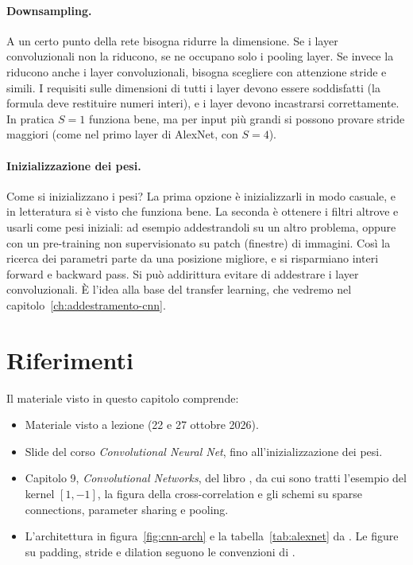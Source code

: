 \paragraph{Downsampling.}
A un certo punto della rete bisogna ridurre la dimensione. Se i layer convoluzionali non la riducono, se ne occupano solo i pooling layer. Se invece la riducono anche i layer convoluzionali, bisogna scegliere con attenzione stride e simili. I requisiti sulle dimensioni di tutti i layer devono essere soddisfatti (la formula deve restituire numeri interi), e i layer devono incastrarsi correttamente. In pratica $S = 1$ funziona bene, ma per input più grandi si possono provare stride maggiori (come nel primo layer di AlexNet, con $S = 4$).

\paragraph{Inizializzazione dei pesi.}
Come si inizializzano i pesi? La prima opzione è inizializzarli in modo casuale, e in letteratura si è visto che funziona bene. La seconda è ottenere i filtri altrove e usarli come pesi iniziali: ad esempio addestrandoli su un altro problema, oppure con un pre-training non supervisionato su patch (finestre) di immagini. Così la ricerca dei parametri parte da una posizione migliore, e si risparmiano interi forward e backward pass. Si può addirittura evitare di addestrare i layer convoluzionali. È l'idea alla base del transfer learning, che vedremo nel capitolo~\ref{ch:addestramento-cnn}.

\section*{Riferimenti}
Il materiale visto in questo capitolo comprende:
\begin{itemize}
    \item Materiale visto a lezione (22 e 27 ottobre 2026).
    \item Slide del corso \emph{Convolutional Neural Net}, fino all'inizializzazione dei pesi.
    \item Capitolo 9, \emph{Convolutional Networks}, del libro  \cite{Goodfellow-et-al-2016}, da cui sono tratti l'esempio del kernel $[1, -1]$, la figura della cross-correlation e gli schemi su sparse connections, parameter sharing e pooling.
    \item L'architettura in figura~\ref{fig:cnn-arch} e la tabella~\ref{tab:alexnet} da  \cite{Krizhevsky2012}. Le figure su padding, stride e dilation seguono le convenzioni di  \cite{Dumoulin2016}.
\end{itemize}
